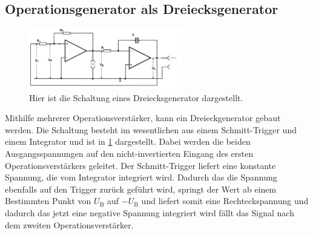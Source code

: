 \subsection{Operationsgenerator als Dreiecksgenerator}
\begin{figure}[h!]
	\centering
	\includegraphics[width = 0.6\textwidth]{../Grafiken/Dreieckgenerator.png}
	\caption{Hier ist die Schaltung eines Dreiecksgenerator dargestellt. \cite{V51} \label{fig:Dreieck}}
\end{figure}
Mithilfe mehrerer Operationsverstärker, kann ein Dreieckgenerator gebaut werden.
Die Schaltung besteht im wesentlichen aus einem Schmitt-Trigger und einem Integrator und ist in \cref{fig:Dreieck} dargestellt.
Dabei werden die beiden Ausgangsspannungen auf den nicht-invertierten Eingang des ersten Operationsverstärkers geleitet.
Der Schmitt-Trigger liefert eine konstante Spannung, die vom Integrator integriert wird.
Dadurch das die Spannung ebenfalls auf den Trigger zurück geführt wird, springt der Wert ab einem Bestimmten Punkt von $U_\text{B}$ auf $-U_\text{B}$ und liefert somit eine Rechteckspannung und dadurch das jetzt eine negative Spannung integriert wird fällt das Signal nach dem zweiten Operationsverstärker.

